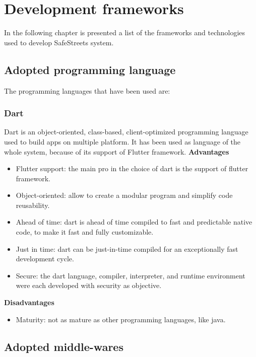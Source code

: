 \documentclass[../ITD.tex]{subfiles}
\begin{document}
    \chapter{Development frameworks}\label{ch: development-frameworks}
    In the following chapter is presented a list of the frameworks and technologies used to develop SafeStreets system.
    \section{Adopted programming language}\label{sec:adopted-programming-laguage}
    The programming languages that have been used are:
    \subsection{Dart}\label{subsec:dart}
    Dart is an object-oriented, class-based, client-optimized programming language used to build apps on multiple platform.
    It has been used as language of the whole system, because of its support of Flutter framework.
    \newline
    \textbf{Advantages}
    \begin{itemize}
        \item Flutter support: the main pro in the choice of dart is the support of flutter framework.
        \item Object-oriented: allow to create a modular program and simplify code reusability.
        \item Ahead of time: dart is ahead of time compiled to fast and predictable native code, to make it fast and fully customizable.
        \item Just in time: dart can be just-in-time compiled for an exceptionally fast development cycle.
        \item Secure: the dart language, compiler, interpreter, and runtime environment were each developed with security as objective.
    \end{itemize}

    \textbf{Disadvantages}
    \begin{itemize}
        \item Maturity: not as mature as other programming languages, like java.
    \end{itemize}

    \section{Adopted middle-wares}\label{sec:adopted-middle-wares}
\end{document}
